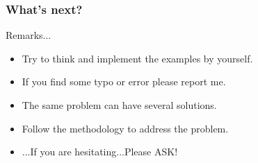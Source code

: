 \documentclass[xcolor=dvipsnames,dvip,notes=show,table]{beamer}
\begin{document}
\begin{frame}[fragile]
\frametitle{What's next?}
\begin{exampleblock}{Remarks...}
\begin{itemize}
 \item Try to think and implement the examples by yourself.
 \item If you find some typo or error please report me.
 \item The same problem can have several solutions.
 \item Follow the methodology to address the problem.
 \item ...If you are hesitating...Please ASK!
\end{itemize}

\end{exampleblock}



\end{frame}

% 
\frame{
\titlepage

}


\end{document}
